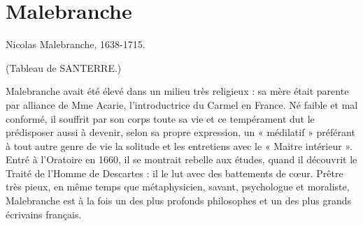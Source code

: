 
\chapter{Malebranche}

 

Nicolas Malebranche, 1638-1715.

(Tableau de SANTERRE.)

Malebranche avait été élevé dans un milieu
très religieux : sa mère était parente par
alliance de Mme Acarie, l’introductrice du
Carmel en France. Né faible et mal conformé,
il souffrit par son corps toute sa
vie et ce tempérament dut le prédisposer
aussi à devenir, selon sa propre expression,
un « médilatif » préférant à tout autre genre
de vie la solitude et les entretiens avec le
« Maitre intérieur ». Entré à l'Oratoire en
1660, il se montrait rebelle aux études,
quand il découvrit le Traité de l'Homme
de Descartes : il le lut avec des battements
de cœur. Prêtre très pieux, en même temps
que métaphysicien, savant, psychologue et
moraliste, Malebranche est à la fois un
des plus profonds philosophes et un des
plus grands écrivains français.
